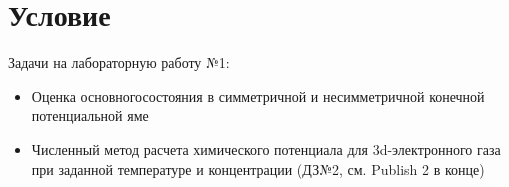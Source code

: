 \section{Условие}

Задачи на лабораторную работу №1:
\begin{itemize}
	\item Оценка основногосостояния в симметричной и несимметричной конечной потенциальной яме
	\item  Численный метод расчета химического потенциала для 3d-электронного газа при заданной температуре и концентрации (ДЗ№2, см. Publish 2 в конце)
	
	
	
\end{itemize}

